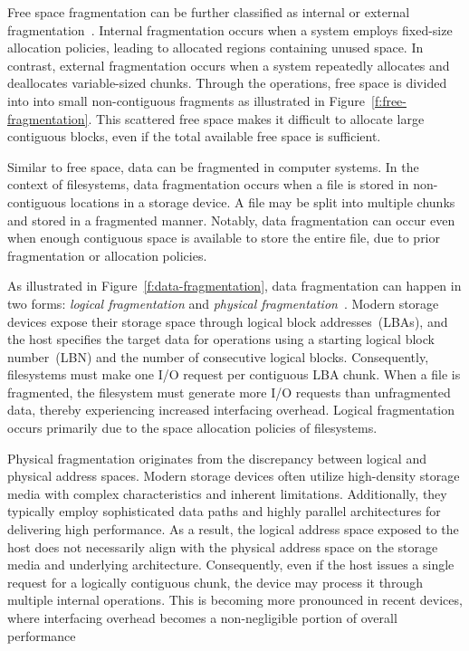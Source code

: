 Free space fragmentation can be further classified as internal or external fragmentation~\cite{ostep,os-textbook}.
Internal fragmentation occurs when a system employs fixed-size allocation policies, leading to allocated regions containing unused space.
In contrast, external fragmentation occurs when a system repeatedly allocates and deallocates variable-sized chunks.
Through the operations, free space is divided into into small non-contiguous fragments as illustrated in Figure~\ref{f:free-fragmentation}.
This scattered free space makes it difficult to allocate large contiguous blocks, even if the total available free space is sufficient.


Similar to free space, data can be fragmented in computer systems.
In the context of filesystems, data fragmentation occurs when a file is stored in non-contiguous locations in a storage device.
A file may be split into multiple chunks and stored in a fragmented manner.
Notably, data fragmentation can occur even when enough contiguous space is available to store the entire file, due to prior fragmentation or allocation policies.

As illustrated in Figure~\ref{f:data-fragmentation}, data fragmentation can happen in two forms: \emph{logical fragmentation} and \emph{physical fragmentation}~\cite{janusd:atc17}.
Modern storage devices expose their storage space through logical block addresses~(LBAs), and the host specifies the target data for operations using a starting logical block number~(LBN) and the number of consecutive logical blocks.
Consequently, filesystems must make one I/O request per contiguous LBA chunk.
When a file is fragmented, the filesystem must generate more I/O requests than unfragmented data, thereby experiencing increased interfacing overhead.
Logical fragmentation occurs primarily due to the space allocation policies of filesystems.

Physical fragmentation originates from the discrepancy between logical and physical address spaces.
Modern storage devices often utilize high-density storage media with complex characteristics and inherent limitations.
Additionally, they typically employ sophisticated data paths and highly parallel architectures for delivering high performance.
As a result, the logical address space exposed to the host does not necessarily align with the physical address space on the storage media and underlying architecture.
Consequently, even if the host issues a single request for a logically contiguous chunk, the device may process it through multiple internal operations.
This is becoming more pronounced in recent devices, where interfacing overhead becomes a non-negligible portion of overall performance~\cite{Problem_in_SSD_Empirical,senescence:fast17,Problem_in_SSD_Mobile_Devices,survey:ictc23,no-afraid:fast24,defrag-mobile:atc17,fragpicker:sosp21}


